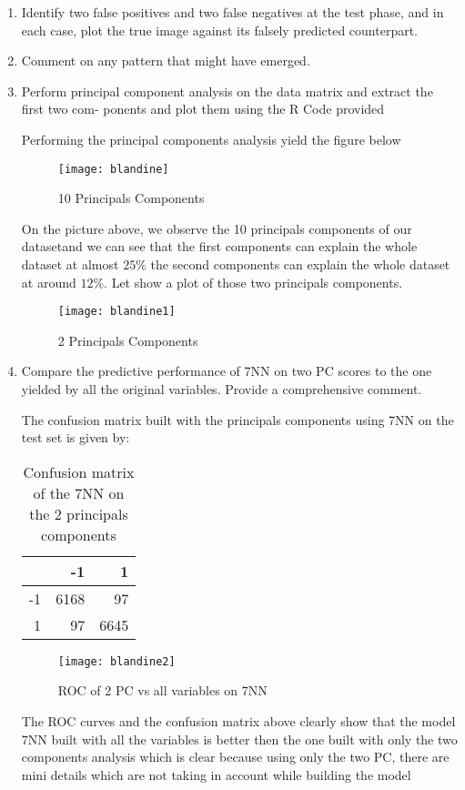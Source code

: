 \documentclass[12pt,a4paper]{article}
\begin{document}
\begin{enumerate}
	
\item Identify two false positives and two false negatives at the test phase, and in each case,
plot the true image against its falsely predicted counterpart.
	

\item  Comment on any pattern that might have emerged.
	
	
	
\item  Perform principal component analysis on the data matrix and extract the first two com-
ponents and plot them using the R Code provided
	
Performing the principal components analysis yield the figure below

\begin{figure}[H]
	\centering
	\texttt{[image: blandine]}
	\caption{10 Principals Components}
\end{figure}
	
On the picture above, we observe the 10 principals components of our datasetand we can see that the first components can explain the  whole dataset at almost $25\%$ the second components can explain the whole dataset at around $12\%$. Let show a plot of those two principals components.
	
	
\begin{figure}[H]
	\centering
	\texttt{[image: blandine1]}
	\caption{2 Principals Components}
\end{figure}	

\item 	Compare the predictive performance of 7NN on two PC scores to the one yielded by all
the original variables. Provide a comprehensive comment.


The confusion matrix built with the principals components using 7NN on the test set is given by:

\begin{table}[H]
	\centering
	\caption{Confusion matrix of the 7NN on the 2 principals components}
	\begin{tabular}{rrr}
		\hline
		& -1 & 1 \\ 
		\hline
		-1 & 6168 &  97 \\ 
		1 &  97 & 6645 \\ 
		\hline
	\end{tabular}
\end{table}

\begin{figure}[H]
	\centering
	\texttt{[image: blandine2]}
	\caption{ROC of 2 PC vs all variables on 7NN}
\end{figure}
The ROC curves and the confusion matrix above clearly show that the model 7NN built with all the variables is better
then the one built with only the two components analysis which is clear because using only the two PC, there are mini details which are not taking in account while building the model

\end{enumerate}
\end{document}
